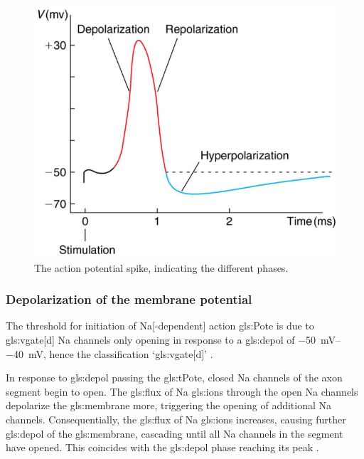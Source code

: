 \documentclass[class={myRUCProject}, crop=false]{standalone}
\begin{document}

\begin{figure}[H]
  \centering
  \includegraphics[width=0.5\linewidth]{Pictures/Anakin/AP.png}
  \caption{The action potential spike, indicating the different phases.}\label{fig:AP}
\end{figure}


\subsubsection{Depolarization of the membrane potential}\label{sec:depol}
The threshold for initiation of \gls{Na}[-dependent] action \gls{gls:Pote} is due to \gls{gls:vgate}[d] \gls{Na} channels only opening in response to a \gls{gls:depol} of \qtyrange{-50}{-40}{\mV}, hence the classification `\gls{gls:vgate}[d]' \cite{Hammond2015ch4}. 

In response to \gls{gls:depol} passing the \gls{gls:tPote}, closed \gls{Na} channels of the axon segment begin to open. The \gls{gls:flux} of \gls{Na} \glspl{gls:ion} through the open \gls{Na} channels depolarize the \gls{gls:membrane} more, triggering the opening of additional \gls{Na} channels. 
Consequentially, the \gls{gls:flux} of \gls{Na} \glspl{gls:ion} increases, causing further \gls{gls:depol} of the \gls{gls:membrane}, cascading until all \gls{Na} channels in the segment have opened. 
This coincides with the \gls{gls:depol} phase reaching its peak \cite{Hammond2015ch4}. 
\end{document}
